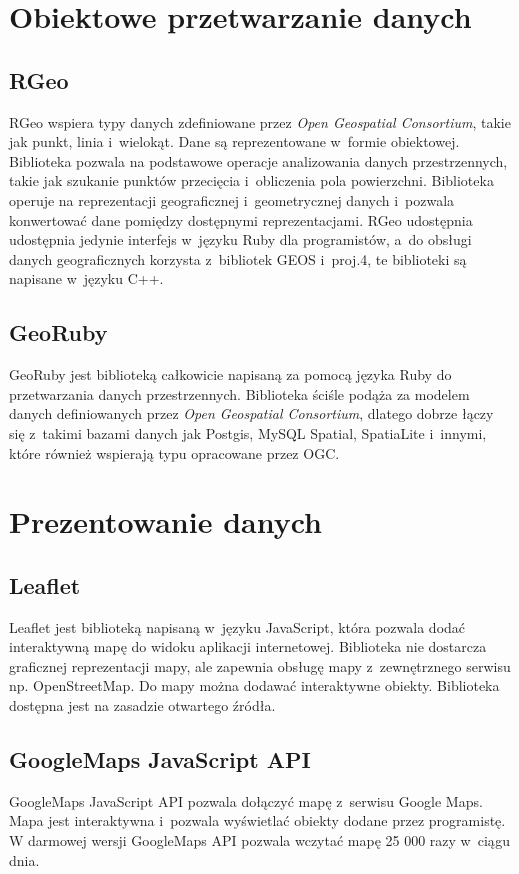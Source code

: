 \documentclass[archivemode]{mgr}
\begin{document}
\section{Obiektowe przetwarzanie danych}
\subsection{RGeo}
RGeo wspiera typy danych zdefiniowane przez \textit{Open Geospatial Consortium}, takie jak punkt, linia i~wielokąt. Dane są reprezentowane w~formie obiektowej. Biblioteka pozwala na podstawowe operacje analizowania danych przestrzennych, takie jak szukanie punktów przecięcia i~obliczenia pola powierzchni. Biblioteka operuje na reprezentacji geograficznej i~geometrycznej danych i~pozwala konwertować dane pomiędzy dostępnymi reprezentacjami. RGeo udostępnia udostępnia jedynie interfejs w~języku Ruby dla programistów, a~do obsługi danych geograficznych korzysta z~bibliotek GEOS i~proj.4, te biblioteki są napisane w~języku C++. \cite{doc_rgeo}

\subsection{GeoRuby}
GeoRuby jest biblioteką całkowicie napisaną za pomocą języka Ruby do przetwarzania danych przestrzennych. Biblioteka ściśle podąża za modelem danych definiowanych przez \textit{Open Geospatial Consortium}, dlatego dobrze łączy się z~takimi bazami danych jak Postgis, MySQL Spatial, SpatiaLite i~innymi, które również wspierają typu opracowane przez OGC. \cite{doc_georuby}

\section{Prezentowanie danych}
\label{sec:maps-tools}
\subsection{Leaflet}
Leaflet jest biblioteką napisaną w~języku JavaScript, która pozwala dodać interaktywną mapę do widoku aplikacji internetowej. Biblioteka nie dostarcza graficznej reprezentacji mapy, ale zapewnia obsługę mapy z~zewnętrznego serwisu np. OpenStreetMap. Do mapy można dodawać interaktywne obiekty. Biblioteka dostępna jest na zasadzie otwartego źródła. \cite{doc_leaflet}

\subsection{GoogleMaps JavaScript API}
GoogleMaps JavaScript API pozwala dołączyć mapę z~serwisu Google Maps. Mapa jest interaktywna i~pozwala wyświetlać obiekty dodane przez programistę. W darmowej wersji GoogleMaps API pozwala wczytać mapę 25 000 razy w~ciągu dnia. \cite{doc_google}
\end{document}
